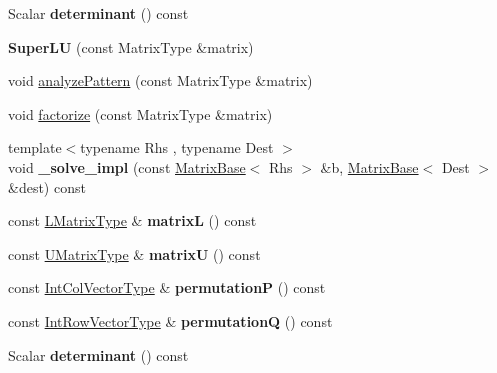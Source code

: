\begin{DoxyCompactItemize}
\item 
\mbox{\label{class_eigen_1_1_super_l_u_ad2ccbf5b565c8dc5e7a0216a86e3662c}} 
Scalar {\bfseries determinant} () const
\item 
\mbox{\label{class_eigen_1_1_super_l_u_a31d051a622837afe71a5a12f9ca995a7}} 
{\bfseries Super\+LU} (const Matrix\+Type \&matrix)
\item 
void \hyperlink{class_eigen_1_1_super_l_u_a493cdfada27415a6037b004ff974eace}{analyze\+Pattern} (const Matrix\+Type \&matrix)
\item 
void \hyperlink{class_eigen_1_1_super_l_u_aa99bc43337da4a4628599cd5169566c4}{factorize} (const Matrix\+Type \&matrix)
\item 
\mbox{\label{class_eigen_1_1_super_l_u_a3aae4b2ab9e4ed45b026e16587b17c23}} 
{\footnotesize template$<$typename Rhs , typename Dest $>$ }\\void {\bfseries \+\_\+solve\+\_\+impl} (const \hyperlink{group___core___module_class_eigen_1_1_matrix_base}{Matrix\+Base}$<$ Rhs $>$ \&b, \hyperlink{group___core___module_class_eigen_1_1_matrix_base}{Matrix\+Base}$<$ Dest $>$ \&dest) const
\item 
\mbox{\label{class_eigen_1_1_super_l_u_a2b04928559e7dcf1a455a493fe8ca350}} 
const \hyperlink{group___core___module_class_eigen_1_1_triangular_view}{L\+Matrix\+Type} \& {\bfseries matrixL} () const
\item 
\mbox{\label{class_eigen_1_1_super_l_u_a5c848ddb3bd3edd1796f354bd69ac258}} 
const \hyperlink{group___core___module_class_eigen_1_1_triangular_view}{U\+Matrix\+Type} \& {\bfseries matrixU} () const
\item 
\mbox{\label{class_eigen_1_1_super_l_u_adf0826125fe13adc57506f4d0c9617c7}} 
const \hyperlink{group___core___module}{Int\+Col\+Vector\+Type} \& {\bfseries permutationP} () const
\item 
\mbox{\label{class_eigen_1_1_super_l_u_ad136353331d04ab8ae824c3f69513265}} 
const \hyperlink{group___core___module}{Int\+Row\+Vector\+Type} \& {\bfseries permutationQ} () const
\item 
\mbox{\label{class_eigen_1_1_super_l_u_a92bd67ec1161e2560aac2074149903c8}} 
Scalar {\bfseries determinant} () const
\end{DoxyCompactItemize}
